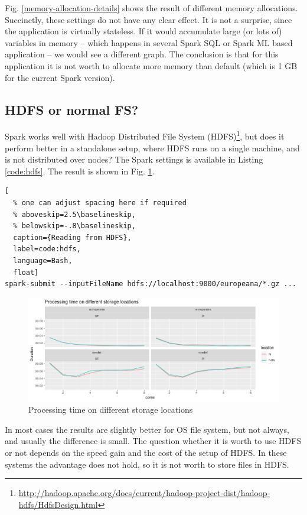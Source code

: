 Fig. \ref{memory-allocation-details} shows the result of different memory allocations. Succinctly, these settings do not have any clear effect. It is not a surprise, since the application is virtually stateless. If it would accumulate large (or lots of) variables in memory -- which happens in several Spark SQL or Spark ML based application -- we would see a different graph. The conclusion is that for this application it is not worth to allocate more memory than default (which is 1 GB for the current Spark version).

\subsection{HDFS or normal FS?}

Spark works well with Hadoop Distributed File System (HDFS)\footnote{\url{http://hadoop.apache.org/docs/current/hadoop-project-dist/hadoop-hdfs/HdfsDesign.html}}, but does it perform better in a standalone setup, where HDFS runs on a single machine, and is not distributed over nodes? The Spark settings is available in Listing \ref{code:hdfs}. The result is shown in Fig. \ref{hdfs-vs-fs}.

\begin{lstlisting}[
  % one can adjust spacing here if required
  % aboveskip=2.5\baselineskip,
  % belowskip=-.8\baselineskip,
  caption={Reading from HDFS},
  label=code:hdfs,
  language=Bash,
  float]
spark-submit --inputFileName hdfs://localhost:9000/europeana/*.gz ...
\end{lstlisting}


\begin{figure}
\includegraphics[width=\textwidth]{images/chapter06/hdfs-vs-fs.png}
\caption{Processing time on different storage locations}
\label{hdfs-vs-fs}
\end{figure}

In most cases the results are slightly better for OS file system, but not always, and usually the difference is small. The question whether it is worth to use HDFS or not depends on the speed gain and the cost of the setup of HDFS. In these systems the advantage does not hold, so it is not worth to store files in HDFS.

